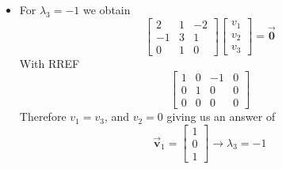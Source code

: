 \documentclass[12pt, landscape, twocolumn]{article}
\let\oldvec\vec
\renewcommand{\vec}[1]{\oldvec{\mathbf{ #1 } } }                    %
\begin{document}
\begin{enumerate}
\begin{itemize}
\[{\begin{array}{r}
                                \end{array} \right]
                                \to \lambda_2 = 1
                            }
                        \]
                    \item For $\lambda_3 = -1$ we obtain
                        \[
                            \left[ \begin{array}{rrr}
                                2 & 1 & -2\\
                                -1 & 3 & 1\\
                                0 & 1 & 0
                            \end{array} \right]
                            \left[ \begin{array}{r}
                                v_1\\ v_2\\ v_3
                            \end{array} \right]
                            = \vec{0}
                        \]
                        With RREF
                        \[
                            \left[ \begin{array}{rrr|r}
                                1 & 0 & -1 & 0\\
                                0 & 1 & 0 & 0\\
                                0 & 0 & 0 & 0
                            \end{array} \right]
                        \]
                        Therefore $v_1 = v_3$, and $v_2 = 0$ giving us an answer of
                        \[
                            \boxed{
                                \vec{v}_1 =
                                \left[ \begin{array}{r}
                                    1\\ 0\\ 1
                                \end{array} \right]
                                \to \lambda_3 = -1
                            }
                        \]
                \end{itemize}
        \end{enumerate}
\end{document}
